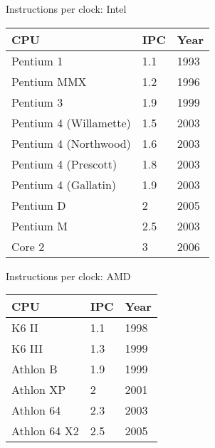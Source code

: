 \documentclass[english,compress]{beamer}
\begin{document}
\begin{frame}{Instructions per clock: Intel}
  \begin{center}
    \begin{tabular}{l|l|l}
      CPU & IPC & Year\\
      \hline
      Pentium 1    &  1.1 & 1993\\
      Pentium MMX  &  1.2 & 1996 \\
      Pentium 3    &   1.9 & 1999 \\
      Pentium 4 (Willamette)&1.5 & 2003\\
      Pentium 4 (Northwood)&1.6 & 2003\\
      Pentium 4 (Prescott)&1.8 & 2003\\
      Pentium 4 (Gallatin)&1.9 & 2003\\
      Pentium D      &2 & 2005 \\
      Pentium M      &2.5 & 2003 \\
      Core 2         &3 & 2006 \\
    \end{tabular}
  \end{center}
\end{frame}
\begin{frame}{Instructions per clock: AMD}
  \begin{center}
    \begin{tabular}{l|l|l}
      CPU & IPC & Year\\
      \hline
      K6 II          &1.1 & 1998\\
      K6 III         &1.3 & 1999\\
      Athlon B       &1.9 & 1999 \\
      Athlon XP      &2 & 2001 \\
      Athlon 64      &2.3 & 2003\\
      Athlon 64 X2   &2.5 & 2005\\
    \end{tabular}
  \end{center}
\end{frame}
\end{document}
